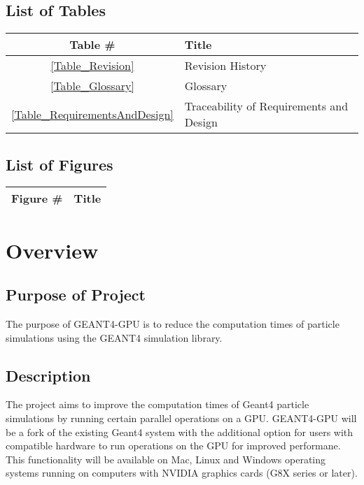 \documentclass[12pt]{article}
\begin{document}
\subsection{List of Tables}
\begin{center}
\begin{tabular}{cl}
\toprule
\bf Table \# & \bf Title\\\midrule
\ref{Table_Revision} & Revision History\\
\ref{Table_Glossary} & Glossary\\
\ref{Table_RequirementsAndDesign} & Traceability of Requirements and Design\\
\bottomrule
\end{tabular}
\end{center}

\subsection{List of Figures}
\begin{center}
\begin{tabular}{cl}
\toprule
\bf Figure \# & \bf Title\\\midrule
\bottomrule
\end{tabular}
\end{center}

\section{Overview}
\subsection{Purpose of Project}
The purpose of GEANT4-GPU is to reduce the computation times of particle simulations using the GEANT4 simulation library.

\subsection{Description}
The project aims to improve the computation times of Geant4 particle simulations by running certain parallel operations on a GPU. GEANT4-GPU will be a fork of the existing Geant4 system with the additional option for users with compatible hardware to run operations on the GPU for improved performane. This functionality will be available on Mac, Linux and Windows operating systems running on computers with NVIDIA graphics cards (G8X series or later).\\
\end{document}
